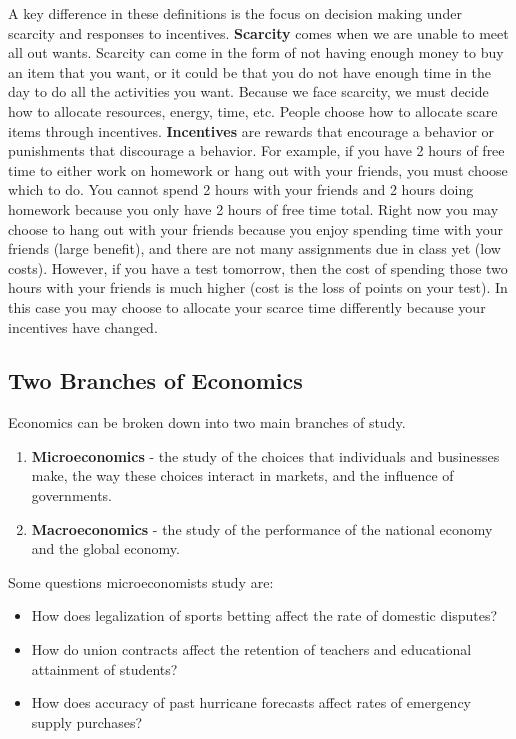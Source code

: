 \documentclass[
]{book}
\providecommand{\tightlist}{%
  \setlength{\itemsep}{0pt}\setlength{\parskip}{0pt}}
\begin{document}
A key difference in these definitions is the focus on decision making under scarcity and responses to incentives. \textbf{Scarcity} comes when we are unable to meet all out wants. Scarcity can come in the form of not having enough money to buy an item that you want, or it could be that you do not have enough time in the day to do all the activities you want. Because we face scarcity, we must decide how to allocate resources, energy, time, etc. People choose how to allocate scare items through incentives. \textbf{Incentives} are rewards that encourage a behavior or punishments that discourage a behavior. For example, if you have 2 hours of free time to either work on homework or hang out with your friends, you must choose which to do. You cannot spend 2 hours with your friends and 2 hours doing homework because you only have 2 hours of free time total. Right now you may choose to hang out with your friends because you enjoy spending time with your friends (large benefit), and there are not many assignments due in class yet (low costs). However, if you have a test tomorrow, then the cost of spending those two hours with your friends is much higher (cost is the loss of points on your test). In this case you may choose to allocate your scarce time differently because your incentives have changed.

\subsection{Two Branches of Economics}\label{two-branches-of-economics}

Economics can be broken down into two main branches of study.

\begin{enumerate}
\def\labelenumi{\arabic{enumi}.}
\tightlist
\item
  \textbf{Microeconomics} - the study of the choices that individuals and businesses make, the way these choices interact in markets, and the influence of governments.
\item
  \textbf{Macroeconomics} - the study of the performance of the national economy and the global economy.
\end{enumerate}

Some questions microeconomists study are:

\begin{itemize}
\tightlist
\item
  How does legalization of sports betting affect the rate of domestic disputes?
\item
  How do union contracts affect the retention of teachers and educational attainment of students?
\item
  How does accuracy of past hurricane forecasts affect rates of emergency supply purchases?
\end{itemize}
\end{document}
